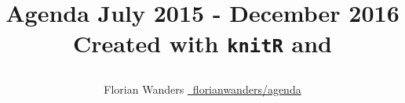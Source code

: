 \documentclass[11pt,a4paper]{book}\usepackage[]{graphicx}\usepackage[]{color}
\def\lsin{\lstinline[basicstyle=\ttfamily,breaklines=true,]}%for inline verbatim
\begin{document}
\begin{titlepage}
\title{\parbox{\linewidth}{%
  \centering%
  Agenda\endgraf
  July 2015 - December 2016\endgraf\bigskip
  Created with \lsin{knitR} and \XeLaTeX
  }
}
\author{\parbox{\linewidth}{%
  \centering%
  Florian Wanders\endgraf\bigskip
  \href{https://github.com/FlorianWanders/agenda}{\faGithub~florianwanders/agenda}
  }
}
\date{}
\maketitle
\end{titlepage}

\begin{landscape}


\end{landscape}
\end{document}
